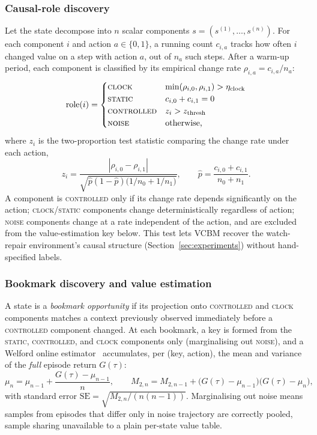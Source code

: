 \subsubsection{Causal-role discovery}
Let the state decompose into $n$ scalar components $s = (s^{(1)}, \dots, s^{(n)})$. For each component $i$ and action $a \in \{0,1\}$, a running count $c_{i,a}$ tracks how often $i$ changed value on a step with action $a$, out of $n_a$ such steps. After a warm-up period, each component is classified by its empirical change rate $\rho_{i,a} = c_{i,a}/n_a$:
\begin{equation}
  \mathrm{role}(i) =
  \begin{cases}
    \textsc{clock}      & \min(\rho_{i,0}, \rho_{i,1}) > \eta_{\mathrm{clock}} \\
    \textsc{static}     & c_{i,0} + c_{i,1} = 0                                \\
    \textsc{controlled} & z_i > z_{\mathrm{thresh}}                            \\
    \textsc{noise}      & \text{otherwise,}
  \end{cases}
  \label{eq:causal-role}
\end{equation}
where $z_i$ is the two-proportion test statistic comparing the change rate under each action,
\begin{equation}
  z_i = \frac{|\rho_{i,0} - \rho_{i,1}|}{\sqrt{\hat{p}(1-\hat{p})\big(1/n_0 + 1/n_1\big)}}, \qquad \hat{p} = \frac{c_{i,0}+c_{i,1}}{n_0+n_1} .
  \label{eq:z-test}
\end{equation}
A component is \textsc{controlled} only if its change rate depends significantly on the action; \textsc{clock}/\textsc{static} components change deterministically regardless of action; \textsc{noise} components change at a rate independent of the action, and are excluded from the value-estimation key below. This test lets VCBM recover the watch-repair environment's causal structure (Section~\ref{sec:experiments}) without hand-specified labels.

\subsubsection{Bookmark discovery and value estimation}
A state is a \emph{bookmark opportunity} if its projection onto \textsc{controlled} and \textsc{clock} components matches a context previously observed immediately before a \textsc{controlled} component changed. At each bookmark, a key is formed from the \textsc{static}, \textsc{controlled}, and \textsc{clock} components only (marginalising out \textsc{noise}), and a Welford online estimator~\cite{welford1962method} accumulates, per (key, action), the mean and variance of the \emph{full} episode return $G(\tau)$:
\begin{equation}
  \mu_n = \mu_{n-1} + \frac{G(\tau) - \mu_{n-1}}{n}, \qquad M_{2,n} = M_{2,n-1} + \big(G(\tau)-\mu_{n-1}\big)\big(G(\tau)-\mu_n\big) ,
  \label{eq:welford}
\end{equation}
with standard error $\mathrm{SE} = \sqrt{M_{2,n}/(n(n-1))}$. Marginalising out noise means samples from episodes that differ only in noise trajectory are correctly pooled, sample sharing unavailable to a plain per-state value table.

